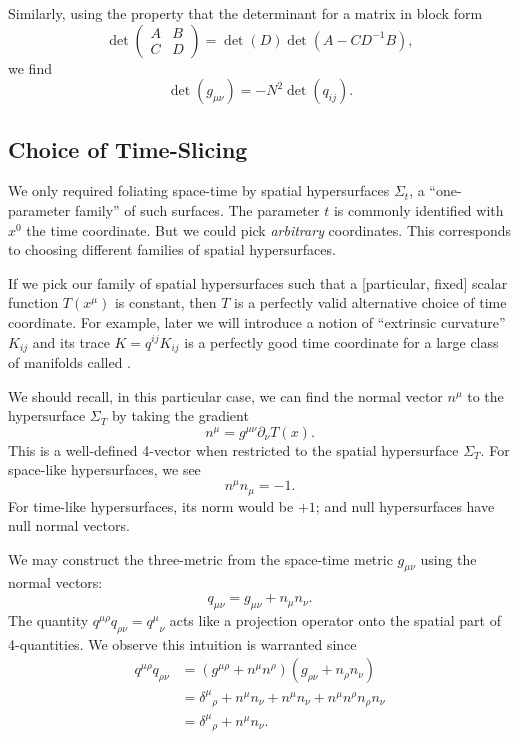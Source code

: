Similarly, using the property that the determinant for a matrix in block
form
\begin{equation}
\det\begin{pmatrix}A & B\\ C & D
\end{pmatrix} = \det(D)\det(A - CD^{-1}B),
\end{equation}
we find
\begin{equation}
\det(g_{\mu\nu}) = -N^{2}\det(q_{ij}).
\end{equation}

\subsection{Choice of Time-Slicing}

We only required foliating space-time by spatial hypersurfaces
$\Sigma_{t}$, a ``one-parameter family'' of such surfaces. The parameter
$t$ is commonly identified with $x^{0}$ the time coordinate. But we
could pick \emph{arbitrary} coordinates. This corresponds to choosing
different families of spatial hypersurfaces.

If we pick our family of spatial hypersurfaces such that a [particular,
fixed] scalar function $T(x^{\mu})$ is constant, then $T$ is a perfectly
valid alternative choice of time coordinate. For example, later we will
introduce a notion of ``extrinsic curvature'' $K_{ij}$ and its trace
$K=q^{ij}K_{ij}$ is a perfectly good time coordinate for a large class
of manifolds called .

We should recall, in this particular case, we can find the normal vector
$n^{\mu}$ to the hypersurface $\Sigma_{T}$ by taking the gradient
\begin{equation}
n^{\mu} = g^{\mu\nu}\partial_{\nu}T(x).
\end{equation}
This is a well-defined 4-vector when restricted to the spatial
hypersurface $\Sigma_{T}$. For space-like hypersurfaces, we see
\begin{equation}
n^{\mu}n_{\mu} = -1.
\end{equation}
For time-like hypersurfaces, its norm would be $+1$; and null
hypersurfaces have null normal vectors.

We may construct the three-metric from the space-time metric
$g_{\mu\nu}$ using the normal vectors:
\begin{equation}
q_{\mu\nu} = g_{\mu\nu} + n_{\mu}n_{\nu}.
\end{equation}
The quantity $q^{\mu\rho}q_{\rho\nu} = {q^{\mu}}_{\nu}$ acts like a
projection operator onto the spatial part of 4-quantities. We observe
this intuition is warranted since
\begin{subequations}
\begin{align}
q^{\mu\rho}q_{\rho\nu}
&= (g^{\mu\rho} + n^{\mu}n^{\rho})(g_{\rho\nu} + n_{\rho}n_{\nu})\\
&= {\delta^{\mu}}_{\rho} + n^{\mu}n_{\nu} + n^{\mu}n_{\nu} + n^{\mu}n^{\rho}n_{\rho}n_{\nu}\\
&= {\delta^{\mu}}_{\rho} + n^{\mu}n_{\nu}.
\end{align}
\end{subequations}


